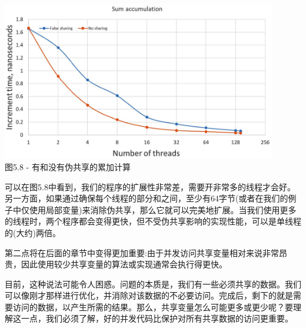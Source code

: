 \begin{center}
\includegraphics[width=0.9\textwidth]{content/1/chapter5/images/8.jpg}\\
图5.8 - 有和没有伪共享的累加计算
\end{center}

可以在图5.8中看到，我们的程序的扩展性非常差，需要开非常多的线程才会好。另一方面，如果通过确保每个线程的部分和之间，至少有64字节(或者在我们的例子中仅使用局部变量)来消除伪共享，那么它就可以完美地扩展。当我们使用更多的线程时，两个程序都会变得更快，但不受伪共享影响的实现性能，可以是单线程的(大约)两倍。

第二点将在后面的章节中变得更加重要:由于并发访问共享变量相对来说非常昂贵，因此使用较少共享变量的算法或实现通常会执行得更快。

目前，这种说法可能令人困惑。问题的本质是，我们有一些必须共享的数据。我们可以像刚才那样进行优化，并消除对该数据的不必要访问。完成后，剩下的就是需要访问的数据，以产生所需的结果。那么，共享变量怎么可能更多或更少呢？要理解这一点，我们必须了解，好的并发代码比保护对所有共享数据的访问更重要。






































